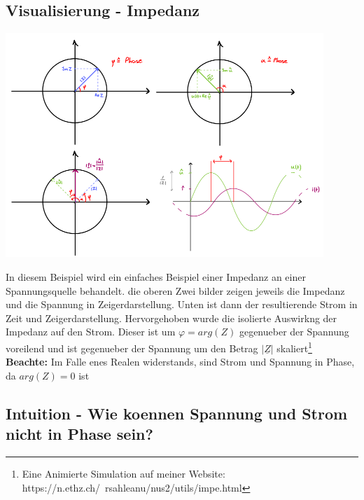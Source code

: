 \documentclass[11pt,a4paper]{article}
\begin{document}
\subsection{Visualisierung - Impedanz}
\begin{center}
    \includegraphics[width=0.9\textwidth]{last.png}

\end{center}
In diesem Beispiel wird ein einfaches Beispiel einer Impedanz an einer Spannungsquelle behandelt. die oberen Zwei bilder zeigen jeweils die Impedanz und die Spannung in Zeigerdarstellung. Unten ist dann der resultierende Strom in Zeit und Zeigerdarstellung. Hervorgehoben wurde die isolierte Auswirkng der Impedanz auf den Strom. Dieser ist um $\varphi = arg(Z)$ gegenueber der Spannung voreilend und ist gegenueber der Spannung um den Betrag $|\underline{Z}|$ skaliert\footnote{Eine Animierte Simulation auf meiner Website: https://n.ethz.ch/~rsahleanu/nus2/utils/impe.html}\\
\textbf{Beachte:} Im Falle enes Realen widerstands, sind Strom und Spannung in Phase, da $arg(Z) = 0$ ist
\subsection{Intuition - Wie koennen Spannung und Strom nicht in Phase sein? }
\end{document}
